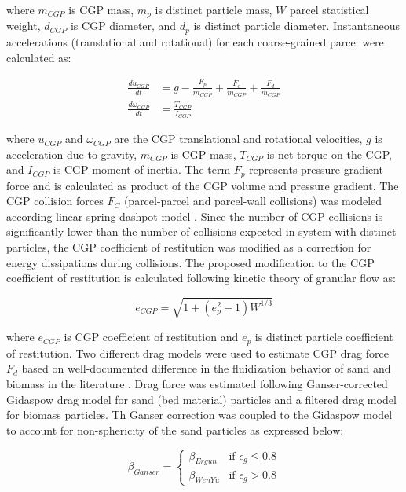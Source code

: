 where $m_{CGP}$ is CGP mass, $m_p$ is distinct particle mass, $W$ parcel statistical weight, $d_{CGP}$ is CGP diameter, and $d_p$ is distinct particle diameter. Instantaneous accelerations (translational and rotational) for each coarse-grained parcel were calculated as:

\begin{align}
    \frac{d u_{CGP}}{dt} &= g - \frac{F_p}{m_{CGP}} + \frac{F_c}{m_{CGP}} + \frac{F_d}{m_{CGP}} \\
    \frac{d \omega_{CGP}}{dt} &= \frac{T_{CGP}}{I_{CGP}}
\end{align}

where $u_{CGP}$ and $\omega_{CGP}$ are the CGP translational and rotational velocities, $g$ is acceleration due to gravity, $m_{CGP}$ is CGP mass, $T_{CGP}$ is net torque on the CGP, and $I_{CGP}$ is CGP moment of inertia. The term $F_p$ represents pressure gradient force and is calculated as product of the CGP volume and pressure gradient. The CGP collision forces $F_C$ (parcel-parcel and parcel-wall collisions) was modeled according linear spring-dashpot model \cite{Navarro-2013}. Since the number of CGP collisions is significantly lower than the number of collisions expected in system with distinct particles, the CGP coefficient of restitution was modified as a correction for energy dissipations during collisions. The proposed modification to the CGP coefficient of restitution is calculated following kinetic theory of granular flow \cite{Lu-2014} as:

\begin{equation}
    e_{CGP} = \sqrt{1 + (e_p^2 - 1) W^{1/3}}
\end{equation}

where $e_{CGP}$ is CGP coefficient of restitution and $e_p$ is distinct particle coefficient of restitution. Two different drag models were used to estimate CGP drag force $F_d$ based on well-documented difference in the fluidization behavior of sand and biomass in the literature \cite{Oliveira-2013}. Drag force was estimated following Ganser-corrected Gidaspow drag model for sand (bed material) particles and a filtered drag model for biomass particles. Th Ganser correction \cite{Ganser-1993} was coupled to the Gidaspow model \cite{Gidaspow-1994} to account for non-sphericity of the sand particles as expressed below:

\begin{equation}
    \beta_{Ganser} =
    \begin{cases}
        \beta_{Ergun} & \text{if } \epsilon_g \leq 0.8 \\
        \beta_{WenYu} & \text{if } \epsilon_g > 0.8
    \end{cases}
\end{equation}

